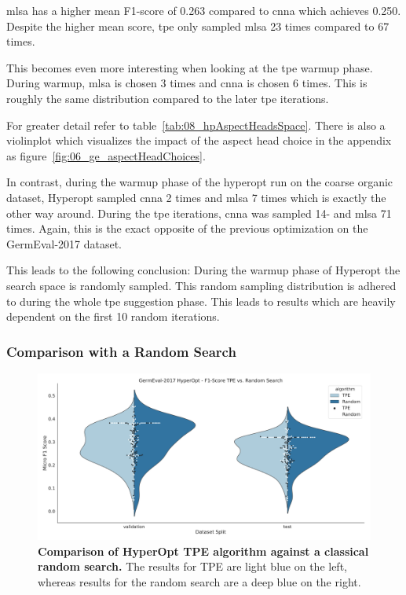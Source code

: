 \gls{mlsa} has a higher mean F1-score of 0.263 compared to \gls{cnna} which achieves 0.250. Despite the higher mean score, \gls{tpe} only sampled \gls{mlsa} 23 times compared to 67 times.

This becomes even more interesting when looking at the \gls{tpe} warmup phase. During warmup, \gls{mlsa} is chosen 3 times and \gls{cnna} is chosen 6 times. This is roughly the same distribution compared to the later \gls{tpe} iterations. 

For greater detail refer to table~\ref{tab:08_hpAspectHeadsSpace}. There is also a violinplot which visualizes the impact of the aspect head choice in the appendix as figure~\ref{fig:06_ge_aspectHeadChoices}.
\medskip

In contrast, during the warmup phase of the hyperopt run on the coarse organic dataset, Hyperopt sampled \gls{cnna} 2 times and \gls{mlsa} 7 times which is exactly the other way around. During the \gls{tpe} iterations, \gls{cnna} was sampled 14- and \gls{mlsa} 71 times. Again, this is the exact opposite of the previous optimization on the GermEval-2017 dataset.
\medskip

This leads to the following conclusion: During the warmup phase of Hyperopt the search space is randomly sampled. This random sampling distribution is adhered to during the whole \gls{tpe} suggestion phase. This leads to results which are heavily dependent on the first 10 random iterations.

\subsubsection*{Comparison with a Random Search}

\begin{figure}[ht]
	\centering
	\includegraphics[width=\textwidth]{figures/06_results/06_hp_ge_vio_tpeRand}
	\caption{\textbf{Comparison of HyperOpt TPE algorithm against a classical random search.} The results for TPE are light blue on the left, whereas results for the random search are a deep blue on the right.}
	\label{fig:06_HpOptimTpe_Rand}
\end{figure}

